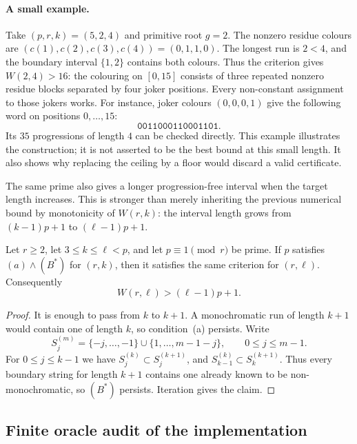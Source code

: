 \paragraph{A small example.}
Take $(p,r,k)=(5,2,4)$ and primitive root $g=2$. The nonzero residue colours
are $(c(1),c(2),c(3),c(4))=(0,1,1,0)$. The longest run is $2<4$, and the
boundary interval $\{1,2\}$ contains both colours. Thus the criterion gives
$W(2,4)>16$: the colouring on $[0,15]$ consists of three repeated nonzero
residue blocks separated by four joker positions. Every non-constant
assignment to those jokers works. For instance, joker colours $(0,0,0,1)$
give the following word on positions $0,\ldots,15$:
\[
 \mathtt{0011000110001101}.
\]
Its $35$ progressions of length $4$ can be checked directly.
This example illustrates the construction;
it is not asserted to be the best bound at this small length. It also shows
why replacing the ceiling by a floor would discard a valid certificate.

The same prime also gives a longer progression-free interval when the target
length increases. This is stronger than merely inheriting the previous
numerical bound by monotonicity of $W(r,k)$: the interval length grows from
$(k-1)p+1$ to $(\ell-1)p+1$.

\begin{lemma}\label{lem:k-monotone}
Let $r\ge2$, let $3\le k\le \ell<p$, and let $p\equiv1\pmod r$ be prime. If
$p$ satisfies $(a)\wedge(B^{*})$ for $(r,k)$, then it satisfies the same
criterion for $(r,\ell)$. Consequently
\[
  W(r,\ell)>(\ell-1)p+1.
\]
\end{lemma}
\begin{proof}
It is enough to pass from $k$ to $k+1$. A monochromatic run of length $k+1$
would contain one of length $k$, so condition~(a) persists. Write
\[
 S_j^{(m)}=\{-j,\dots,-1\}\cup\{1,\dots,m-1-j\},
 \qquad 0\le j\le m-1.
\]
For $0\le j\le k-1$ we have $S_j^{(k)}\subset S_j^{(k+1)}$, and
$S_{k-1}^{(k)}\subset S_k^{(k+1)}$. Thus every boundary string for length
$k+1$ contains one already known to be non-monochromatic, so $(B^{*})$
persists. Iteration gives the claim.
\end{proof}



\subsection{Finite oracle audit of the implementation}\label{ss:oracle}

